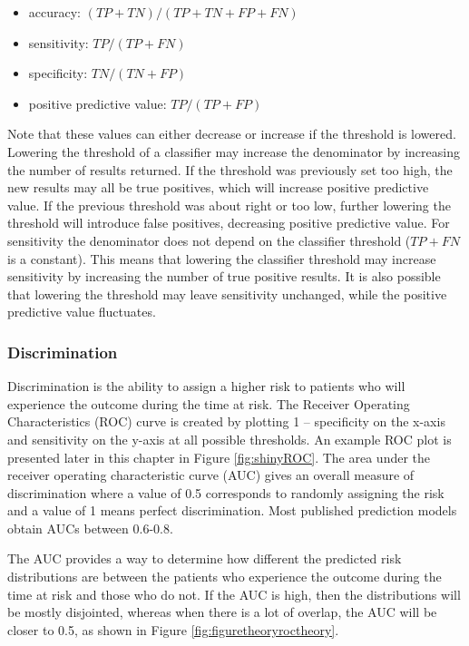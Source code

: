 \documentclass[11pt]{book}
\providecommand{\tightlist}{%
  \setlength{\itemsep}{0pt}\setlength{\parskip}{0pt}}
\theoremstyle{definition}
\theoremstyle{definition}
\theoremstyle{definition}
\theoremstyle{remark}
\begin{document}
\begin{itemize}
\tightlist
\item
  accuracy: \((TP+TN)/(TP+TN+FP+FN)\)
\item
  sensitivity: \(TP/(TP+FN)\)
\item
  specificity: \(TN/(TN+FP)\)
\item
  positive predictive value: \(TP/(TP+FP)\)
\end{itemize}

Note that these values can either decrease or increase if the threshold is lowered. Lowering the threshold of a classifier may increase the denominator by increasing the number of results returned. If the threshold was previously set too high, the new results may all be true positives, which will increase positive predictive value. If the previous threshold was about right or too low, further lowering the threshold will introduce false positives, decreasing positive predictive value. For sensitivity the denominator does not depend on the classifier threshold (\(TP+FN\) is a constant). This means that lowering the classifier threshold may increase sensitivity by increasing the number of true positive results. It is also possible that lowering the threshold may leave sensitivity unchanged, while the positive predictive value fluctuates.

\hypertarget{discrimination}{%
\subsubsection*{Discrimination}\label{discrimination}}

Discrimination is the ability to assign a higher risk to patients who will experience the outcome during the time at risk. The Receiver Operating Characteristics (ROC) curve is created by plotting 1 -- specificity on the x-axis and sensitivity on the y-axis at all possible thresholds. An example ROC plot is presented later in this chapter in Figure \ref{fig:shinyROC}. The area under the receiver operating characteristic curve (AUC) gives an overall measure of discrimination where a value of 0.5 corresponds to randomly assigning the risk and a value of 1 means perfect discrimination. Most published prediction models obtain AUCs between 0.6-0.8.   

The AUC provides a way to determine how different the predicted risk distributions are between the patients who experience the outcome during the time at risk and those who do not. If the AUC is high, then the distributions will be mostly disjointed, whereas when there is a lot of overlap, the AUC will be closer to 0.5, as shown in Figure \ref{fig:figuretheoryroctheory}.
\end{document}
